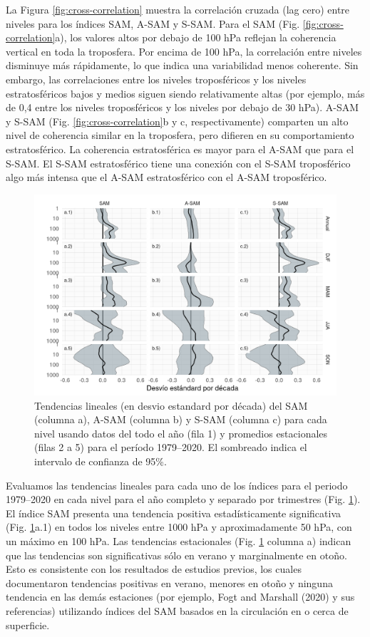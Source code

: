 \documentclass[12pt,oneside]{reedthesis}
\begin{document}
La Figura \ref{fig:cross-correlation} muestra la correlación cruzada (lag cero) entre niveles para los índices SAM, A-SAM y S-SAM.
Para el SAM (Fig. \ref{fig:cross-correlation}a), los valores altos por debajo de 100 hPa reflejan la coherencia vertical en toda la troposfera.
Por encima de 100 hPa, la correlación entre niveles disminuye más rápidamente, lo que indica una variabilidad menos coherente.
Sin embargo, las correlaciones entre los niveles troposféricos y los niveles estratosféricos bajos y medios siguen siendo relativamente altas (por ejemplo, más de 0,4 entre los niveles troposféricos y los niveles por debajo de 30 hPa).
A-SAM y S-SAM (Fig. \ref{fig:cross-correlation}b y c, respectivamente) comparten un alto nivel de coherencia similar en la troposfera, pero difieren en su comportamiento estratosférico.
La coherencia estratosférica es mayor para el A-SAM que para el S-SAM.
El S-SAM estratosférico tiene una conexión con el S-SAM troposférico algo más intensa que el A-SAM estratosférico con el A-SAM troposférico.



\begin{figure}
\includegraphics{figures/30-sam/trends-1} \caption{Tendencias lineales (en desvio estandard por década) del SAM (columna a), A-SAM (columna b) y S-SAM (columna c) para cada nivel usando datos del todo el año (fila 1) y promedios estacionales (filas 2 a 5) para el período 1979--2020. El sombreado indica el intervalo de confianza de 95\%.}\label{fig:trends}
\end{figure}

Evaluamos las tendencias lineales para cada uno de los índices para el periodo 1979--2020 en cada nivel para el año completo y separado por trimestres (Fig. \ref{fig:trends}).
El índice SAM presenta una tendencia positiva estadísticamente significativa (Fig. \ref{fig:trends}a.1) en todos los niveles entre 1000 hPa y aproximadamente 50 hPa, con un máximo en 100 hPa.
Las tendencias estacionales (Fig. \ref{fig:trends} columna a) indican que las tendencias son significativas sólo en verano y marginalmente en otoño.
Esto es consistente con los resultados de estudios previos, los cuales documentaron tendencias positivas en verano, menores en otoño y ninguna tendencia en las demás estaciones (por ejemplo, Fogt and Marshall (2020) y sus referencias) utilizando índices del SAM basados en la circulación en o cerca de superficie.
\end{document}
